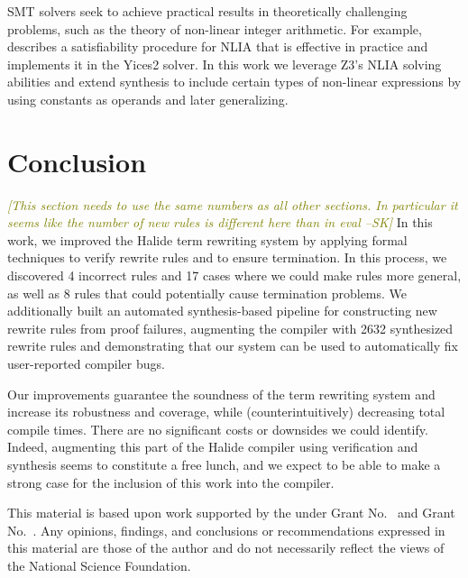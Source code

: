 \documentclass[acmsmall,review,anonymous]{acmart}\settopmatter{printfolios=true,printccs=false,printacmref=false}
\newcommand{\sak}[1]{\textcolor{olive}{\textit{[{#1} --SK]}}}
\newcommand{\NumRulesFixed}{{\color{black} 4}\xspace}
\newcommand{\NumPredicatesRelaxed}{{\color{black} 17}\xspace}
\newcommand{\NumOrderingProblems}{{\color{black} 8}\xspace}
\newcommand{\NumRulesSynthesized}{{\color{black} 2632}\xspace}
\begin{document}
SMT solvers seek to achieve practical results in theoretically challenging problems, such as the theory of non-linear integer arithmetic. For example, \citet{jovanovic2017solving} describes a satisfiability procedure for NLIA that is effective in practice and implements it in the Yices2 solver. In this work we leverage Z3's NLIA solving abilities and extend synthesis to include certain types of non-linear expressions by using constants as operands and later generalizing.

\section{Conclusion}
\sak{This section needs to use the same numbers as all other sections.  In
  particular it seems like the number of new rules is different here than in
  eval}
In this work, we improved the Halide term rewriting system by applying formal
techniques to verify rewrite rules and to ensure termination.  In this process,
we discovered \NumRulesFixed incorrect rules and \NumPredicatesRelaxed cases
where we could make rules more general, as well as \NumOrderingProblems rules
that could potentially cause termination problems.  We additionally built
an automated synthesis-based pipeline for constructing new rewrite rules from
proof failures, augmenting the compiler with \NumRulesSynthesized synthesized
rewrite rules and demonstrating that our system can be used to automatically fix
user-reported compiler bugs.

Our improvements guarantee the soundness of the term rewriting system
and increase its robustness and coverage, while (counterintuitively)
decreasing total compile times. There are no significant costs or
downsides we could identify. Indeed, augmenting this part of the
Halide compiler using verification and synthesis seems to constitute a
free lunch, and we expect to be able to make a strong case for the
inclusion of this work into the compiler.


\begin{acks}                            %
  This material is based upon work supported by the
   under Grant
  No.~ and Grant
  No.~.  Any opinions, findings, and
  conclusions or recommendations expressed in this material are those
  of the author and do not necessarily reflect the views of the
  National Science Foundation.
\end{acks}



\end{document}
